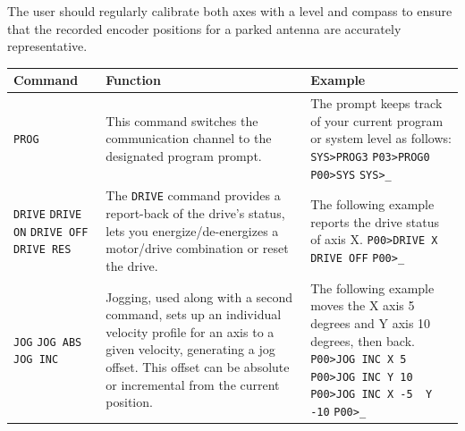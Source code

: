 \documentclass[titlepage]{article}
\begin{document}
The user should regularly calibrate both axes with a level and compass to ensure that the recorded encoder positions for a parked antenna are accurately representative.

\begin{table}[ht]
  \begin{center}
    \begin{tabularx}{\linewidth}{p{2cm}|>{\raggedright\arraybackslash}X|>{\raggedright\arraybackslash}X}
      Command          & Function & Example \\ \hline

      \lstinline|PROG| &
      This command switches the communication channel to the designated
      program prompt. &
      The prompt keeps track of your current program or system level as follows: \newline
      \lstinline|SYS>PROG3| \newline
      \lstinline|P03>PROG0| \newline
      \lstinline|P00>SYS| \newline
      \lstinline|SYS>_|
      \\

      \lstinline|DRIVE| \newline
      \lstinline|DRIVE ON| \newline
      \lstinline|DRIVE OFF| \newline
      \lstinline|DRIVE RES|
      &
      The \lstinline|DRIVE| command provides a report-back of the drive's status, lets you
      energize/de-energizes a motor/drive combination or reset the drive. &
      The following example reports the drive status of axis X. \newline
      \lstinline|P00>DRIVE X| \newline
      \lstinline|DRIVE OFF| \newline
      \lstinline|P00>_|
      \\

      \lstinline|JOG| \newline
      \lstinline|JOG ABS| \newline
      \lstinline|JOG INC| &

      Jogging, used along with a second command, sets up an individual velocity profile for an axis to a given velocity, generating a jog offset. This offset can be absolute or incremental from the current position. &
      The following example moves the X axis 5 degrees and Y axis 10 degrees, then back. \newline
      \lstinline|P00>JOG INC X 5| \newline
      \lstinline|P00>JOG INC Y 10| \newline
      \lstinline|P00>JOG INC X -5  Y -10| \newline
      \lstinline|P00>_|
      \\


\end{tabularx}
\end{center}
\end{table}
\end{document}
